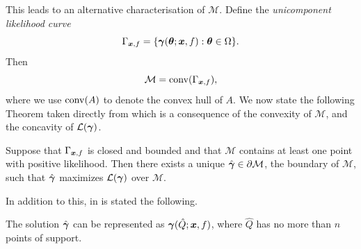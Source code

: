 	This leads to an alternative characterisation of $\mathcal{M}$. Define the \emph{unicomponent likelihood curve}
	\begin{equation}
		\Gamma_{{\bm{{x}}}, f} = \{{\bm{{\gamma}}}({\bm{{\theta}}}; {\bm{{x}}}, f) : {\bm{{\theta}}} \in \Omega\}.
	\end{equation}
	Then
	\begin{equation}
		\mathcal{M} = \mathrm{conv}(\Gamma_{{\bm{{x}}}, f}),
	\end{equation}
	where we use $\mathrm{conv}(A)$ to denote the convex hull of $A$. We now state the following Theorem taken directly from \cite[Theorem 18]{Lindsay1995-sq} which is a consequence of the convexity of $\mathcal{M}$, and the concavity of $\mathcal{L}({\bm{{\gamma}}})$.

	\begin{theorem}
		Suppose that $\Gamma_{{\bm{{x}}}, f}$ is closed and bounded and that $\mathcal{M}$ contains at least one point with positive likelihood. Then there exists a unique $\hat{{\bm{{\gamma}}}} \in \partial \mathcal{M}$, the boundary of $\mathcal{M}$, such that $\hat{{\bm{{\gamma}}}}$ maximizes $\mathcal{L}({\bm{{\gamma}}})$ over $\mathcal{M}$.
		\label{thm: lindsay maximizing likelihood vector point}
	\end{theorem}

	In addition to this, in \cite[Theorem 21]{Lindsay1995-sq} is stated the following.
	\begin{theorem}
		The solution $\hat{{\bm{{\gamma}}}}$ can be represented as ${\bm{{\gamma}}}(\hat{Q};{\bm{{x}}}, f)$, where $\hat{Q}$ has no more than $n$ points of support.
		\label{thm: lindsay no more than n points}
	\end{theorem}

